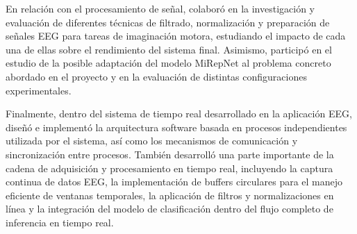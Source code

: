 En relación con el procesamiento de señal, colaboró en la investigación y evaluación de diferentes técnicas de filtrado, normalización y preparación de señales EEG para tareas de imaginación motora, estudiando el impacto de cada una de ellas sobre el rendimiento del sistema final. Asimismo, participó en el estudio de la posible adaptación del modelo MiRepNet al problema concreto abordado en el proyecto y en la evaluación de distintas configuraciones experimentales.

Finalmente, dentro del sistema de tiempo real desarrollado en la aplicación EEG, diseñó e implementó la arquitectura software basada en procesos independientes utilizada por el sistema, así como los mecanismos de comunicación y sincronización entre procesos. También desarrolló una parte importante de la cadena de adquisición y procesamiento en tiempo real, incluyendo la captura continua de datos EEG, la implementación de buffers circulares para el manejo eficiente de ventanas temporales, la aplicación de filtros y normalizaciones en línea y la integración del modelo de clasificación dentro del flujo completo de inferencia en tiempo real.
